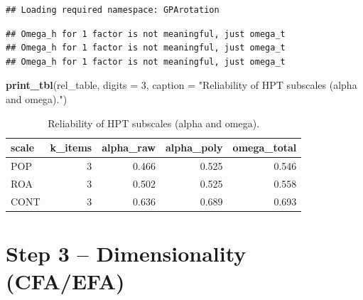\documentclass[
  10pt,
]{article}
\newenvironment{Shaded}{\begin{snugshade}}{\end{snugshade}}
\newcommand{\AttributeTok}[1]{\textcolor[rgb]{0.13,0.29,0.53}{#1}}
\newcommand{\DecValTok}[1]{\textcolor[rgb]{0.00,0.00,0.81}{#1}}
\newcommand{\FunctionTok}[1]{\textcolor[rgb]{0.13,0.29,0.53}{\textbf{#1}}}
\newcommand{\NormalTok}[1]{#1}
\newcommand{\StringTok}[1]{\textcolor[rgb]{0.31,0.60,0.02}{#1}}
\begin{document}
\begin{verbatim}
## Loading required namespace: GPArotation
\end{verbatim}

\begin{verbatim}
## Omega_h for 1 factor is not meaningful, just omega_t
## Omega_h for 1 factor is not meaningful, just omega_t
## Omega_h for 1 factor is not meaningful, just omega_t
\end{verbatim}

\begin{Shaded}
\begin{Highlighting}[]
\FunctionTok{print\_tbl}\NormalTok{(rel\_table, }\AttributeTok{digits =} \DecValTok{3}\NormalTok{, }\AttributeTok{caption =} \StringTok{"Reliability of HPT subscales (alpha and omega)."}\NormalTok{)}
\end{Highlighting}
\end{Shaded}

\begin{longtable}[t]{lrrrr}
\caption{\label{tab:reliability}Reliability of HPT subscales (alpha and omega).}\\
\toprule
scale & k\_items & alpha\_raw & alpha\_poly & omega\_total\\
\midrule
POP & 3 & 0.466 & 0.525 & 0.546\\
ROA & 3 & 0.502 & 0.525 & 0.558\\
CONT & 3 & 0.636 & 0.689 & 0.693\\
\bottomrule
\end{longtable}

\hypertarget{step-3-dimensionality-cfaefa}{%
\section{Step 3 -- Dimensionality
(CFA/EFA)}\label{step-3-dimensionality-cfaefa}}
\end{document}

